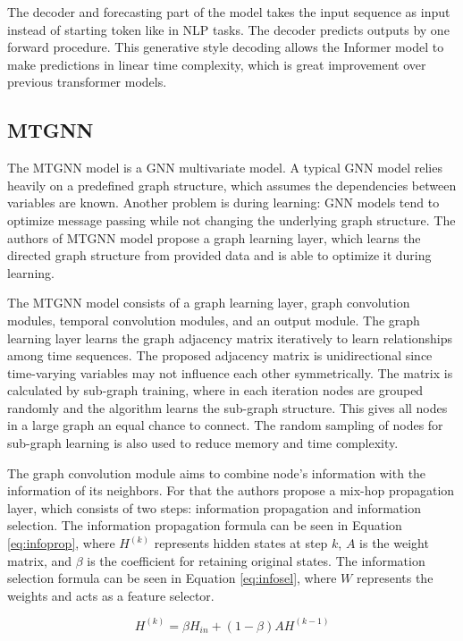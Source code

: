 \documentclass[conference]{IEEEtran}
\begin{document}
The decoder and forecasting part of the model takes the input sequence as input instead of starting token like in NLP tasks.
The decoder predicts outputs by one forward procedure.
This generative style decoding allows the Informer model to make predictions in linear time complexity, which is great improvement over previous transformer models.

\subsection{\textbf{MTGNN}}

The MTGNN model is a GNN multivariate model.
A typical GNN model relies heavily on a predefined graph structure, which assumes the dependencies between variables are known.
Another problem is during learning: GNN models tend to optimize message passing  while not changing the underlying graph structure.
The authors of MTGNN model propose a graph learning layer, which learns the directed graph structure from provided data and is able to optimize it during learning.

The MTGNN model consists of a graph learning layer, graph convolution modules, temporal convolution modules, and an output module.
The graph learning layer learns the graph adjacency matrix iteratively to learn relationships among time sequences.
The proposed adjacency matrix is unidirectional since time-varying variables may not influence each other symmetrically.
The matrix is calculated by sub-graph training, where in each iteration nodes are grouped randomly and the algorithm learns the sub-graph structure.
This gives all nodes in a large graph an equal chance to connect.
The random sampling of nodes for sub-graph learning is also used to reduce memory and time complexity.

The graph convolution module aims to combine node's information with the information of its neighbors.
For that the authors propose a mix-hop propagation layer, which consists of two steps: information propagation and information selection.
The information propagation formula can be seen in Equation \ref{eq:infoprop}, where $H^{(k)}$ represents hidden states at step $k$, $A$ is the weight matrix, and $\beta$ is the coefficient for retaining original states.
The information selection formula can be seen in Equation \ref{eq:infosel}, where $W$ represents the weights and acts as a feature selector.

\begin{equation}
\label{eq:infoprop}
    H^{(k)} = \beta H_{in} + (1-\beta)AH^{(k-1)}
\end{equation}
\end{document}
